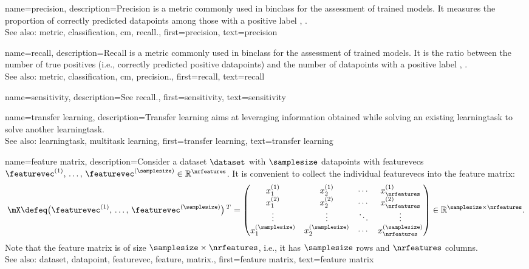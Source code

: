 {name={precision}, 
	description={Precision is a \gls{metric} commonly used in \gls{binclass} for 
		the assessment of trained \glspl{model}. It measures the proportion of correctly 
		predicted \glspl{datapoint} among those with a positive \gls{label} 
		\cite{Juba_Le_2019}, \cite{Rijsbergen1979}.
		\\
		See also: \gls{metric}, \gls{classification}, \gls{cm}, \gls{recall}.},
	first={precision}, 
	text={precision}
}

{name={recall}, 
	description={Recall is a \gls{metric} commonly used in \gls{binclass} for 
		the assessment of trained \glspl{model}. It is the ratio between the number of 
		true positives (i.e., correctly predicted positive \glspl{datapoint}) and the number 
		of \glspl{datapoint} with a positive \gls{label} \cite{Juba_Le_2019}, \cite{Rijsbergen1979}.
		\\ 
		See also: \gls{metric}, \gls{classification}, \gls{cm}, \gls{precision}.},
	first={recall}, 
	text={recall}
}

{name={sensitivity}, 
	description={See \gls{recall}.},
	first={sensitivity}, 
	text={sensitivity}
}

{name={transfer learning},
	description={Transfer learning aims at leveraging information 
		obtained while solving an existing \gls{learningtask} to 
   		solve another \gls{learningtask}.
		\\ 
   		See also: \gls{learningtask}, \gls{multitask learning}},
  	first={transfer learning},
  	text={transfer learning}
}

{name={feature matrix}, 
	description={Consider a \gls{dataset} $\dataset$ 
		with $\samplesize$ \glspl{datapoint} with \glspl{featurevec} 
		$\featurevec^{(1)}, \,\ldots, \,\featurevec^{(\samplesize)} \in \mathbb{R}^{\nrfeatures}$. 
		It is convenient to collect the individual \glspl{featurevec} into 
		the \gls{feature} \gls{matrix}:
		$$\mX \defeq \big(\featurevec^{(1)}, \,\ldots, \,\featurevec^{(\samplesize)}\big)\,^{T} =
		\begin{pmatrix}
			x^{(1)}_{1} & x^{(1)}_{2} & \cdots & x^{(1)}_{\nrfeatures} \\
			x^{(2)}_{1} & x^{(2)}_{2} & \cdots & x^{(2)}_{\nrfeatures} \\
			\vdots      & \vdots      & \ddots & \vdots \\
			x^{(\samplesize)}_{1} & x^{(\samplesize)}_{2} & \cdots & x^{(\samplesize)}_{\nrfeatures}
		\end{pmatrix}
		\in \mathbb{R}^{\samplesize \times \nrfeatures}.$$
		Note that the \gls{feature} \gls{matrix} is of size $\samplesize \times \nrfeatures$, i.e., 
		it has $\samplesize$ rows and $\nrfeatures$ columns.
				\\
		See also: \gls{dataset}, \gls{datapoint}, \gls{featurevec}, \gls{feature}, \gls{matrix}.},
	first={feature matrix},
	text={feature matrix} 
}

